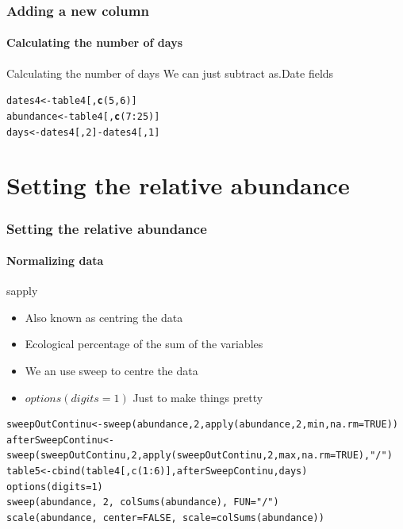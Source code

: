 \documentclass[12pt]{beamer}\usepackage[]{graphicx}\usepackage[]{color}
\makeatletter
\newcommand{\hlnum}[1]{\textcolor[rgb]{0.686,0.059,0.569}{#1}}%
\newcommand{\hlopt}[1]{\textcolor[rgb]{0,0,0}{#1}}%
\newcommand{\hlstd}[1]{\textcolor[rgb]{0.345,0.345,0.345}{#1}}%
\newcommand{\hlkwb}[1]{\textcolor[rgb]{0.69,0.353,0.396}{#1}}%
\newcommand{\hlkwd}[1]{\textcolor[rgb]{0.737,0.353,0.396}{\textbf{#1}}}%
\newenvironment{kframe}{%
 \def\at@end@of@kframe{}%
 \ifinner\ifhmode%
  \def\at@end@of@kframe{\end{minipage}}%
  \begin{minipage}{\columnwidth}%
 \fi\fi%
 \def\FrameCommand##1{\hskip\@totalleftmargin \hskip-\fboxsep
 \colorbox{shadecolor}{##1}\hskip-\fboxsep
     \hskip-\linewidth \hskip-\@totalleftmargin \hskip\columnwidth}%
 \MakeFramed {\advance\hsize-\width
   \@totalleftmargin\z@ \linewidth\hsize
   \@setminipage}}%
 {\par\unskip\endMakeFramed%
 \at@end@of@kframe}
\newenvironment{knitrout}{}{} %
\makeatother
\begin{document}
\begin{frame}[fragile]
  \frametitle{Adding a new column}
  \framesubtitle{Calculating the number of days}
  \begin{block}{Calculating the number of days}
  We can just subtract as.Date fields
  \end{block}
\begin{knitrout}
\color{fgcolor}\begin{kframe}
\begin{alltt}
\hlstd{dates4}\hlkwb{<-}\hlstd{table4[,}\hlkwd{c}\hlstd{(}\hlnum{5}\hlstd{,}\hlnum{6}\hlstd{)]}
\hlstd{abundance}\hlkwb{<-}\hlstd{table4[,}\hlkwd{c}\hlstd{(}\hlnum{7}\hlopt{:}\hlnum{25}\hlstd{)]}
 \hlstd{days}\hlkwb{<-}\hlstd{dates4[,}\hlnum{2}\hlstd{]}\hlopt{-}\hlstd{dates4[,}\hlnum{1}\hlstd{]}
\end{alltt}
\end{kframe}
\end{knitrout}
  
\end{frame}


\section*{Setting the relative abundance}
\begin{frame}[fragile]
  \frametitle{Setting the relative abundance}
  \framesubtitle{Normalizing data}
  \begin{block}{sapply}
  \begin{itemize}
  \item Also known as centring the data
  \item Ecological percentage of the sum of the variables 
  \item We an use sweep to centre the data
  \item $options(digits=1)$ Just to make things pretty
  \end{itemize}
  \end{block}
  \begin{lstlisting}
sweepOutContinu<-sweep(abundance,2,apply(abundance,2,min,na.rm=TRUE))	
afterSweepContinu<-sweep(sweepOutContinu,2,apply(sweepOutContinu,2,max,na.rm=TRUE),"/") 
table5<-cbind(table4[,c(1:6)],afterSweepContinu,days)
options(digits=1)
sweep(abundance, 2, colSums(abundance), FUN="/")
scale(abundance, center=FALSE, scale=colSums(abundance))
 \end{lstlisting}

\end{frame}
\end{document}
